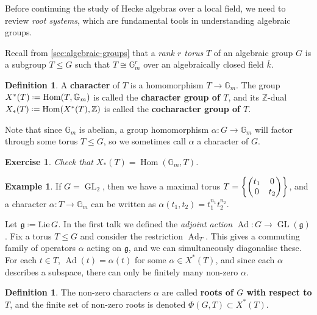 \documentclass[11pt]{report}
\let\mbb\mathbb
\let\mf\mathfrak
\newcommand{\1}{\mathbbm 1}
\newcommand{\Z}{\mathbb{Z}}
\newcommand{\G}{\mbb G}
\newcommand*{\defeq}{\mathrel{\vcenter{\baselineskip0.5ex \lineskiplimit0pt
      \hbox{\scriptsize.}\hbox{\scriptsize.}}}%
  =}
\renewcommand{\bar}{\overline}
\DeclareMathOperator{\Ad}{Ad}
\DeclareMathOperator{\Lie}{Lie}
\DeclareMathOperator{\GL}{GL}
\DeclareMathOperator{\Hom}{Hom}
\theoremstyle{plain}
\newcounter{ex}
\newtheorem{exercise}[ex]{Exercise}
\theoremstyle{definition}
\newtheorem{mydef}[thm]{Definition}
\newtheorem{example}[thm]{Example}
\theoremstyle{remark}
\numberwithin{equation}{section}
\begin{document}
Before continuing the study of Hecke algebras over a local field, we
need to review \emph{root systems}, which are fundamental tools in
understanding algebraic groups.

Recall from \cref{sec:algebraic-groups} that a \emph{rank $r$ torus} $T$ of an algebraic group $G$ is a subgroup $T \le G$ such that $T  \cong \G_{m}^{r}$ over an algebraically closed field $\bar k$.

\begin{mydef}
  A \textbf{character} of $T$ is a homomorphism $T \to \G_{m}$. The
  group $X^{*}(T) \defeq \Hom(T,\G_{m})$ is called the
  \textbf{character group of $T$}, and its $\Z$-dual
  $X_{*}(T) \defeq \Hom(X^{*}(T),\Z)$ is called the
  \textbf{cocharacter group of $T$}.
\end{mydef}

Note that since $\G_{m}$ is abelian, a group homomorphism
$\alpha \colon G \to \G_{m}$ will factor through some torus $T \le G$, so we
sometimes call $\alpha$ a character of $G$.

\begin{exercise}
  Check that $X_{*}(T) = \Hom(\G_{m},T)$. 
\end{exercise}

\begin{example}
  If $G = \GL_{2}$, then we have a maximal torus
  $T = \qty{ \mqty(t_{1} & 0 \\ 0 & t_{2})}$, and a character
  $\alpha \colon T \to \G_{m}$ can be written as
  $\alpha(t_{1},t_{2}) = t_{1}^{n_{1}}t_{2}^{n_{2}}$.
\end{example}

Let $\mf g \defeq \Lie G $. In the first talk we defined the
\emph{adjoint action} $\Ad \colon G \to \GL(\mf g)$. Fix a torus
$T \le G$ and consider the restriction $\Ad_{T}$. This gives a commuting
family of operators $\alpha$ acting on $\mf g$, and we can simultaneously
diagonalise these. For each $t \in T$, $\Ad(t) = \alpha(t)$ for some
$\alpha \in X^{*}(T)$, and since each $\alpha$ describes a subspace, there can
only be finitely many non-zero $\alpha$.

\begin{mydef}
The non-zero characters $\alpha$ are called \textbf{roots of $G$ with respect to $T$}, and the finite set of non-zero roots is denoted $\Phi(G,T) \subset X^{*}(T)$.
\end{mydef}
\end{document}

